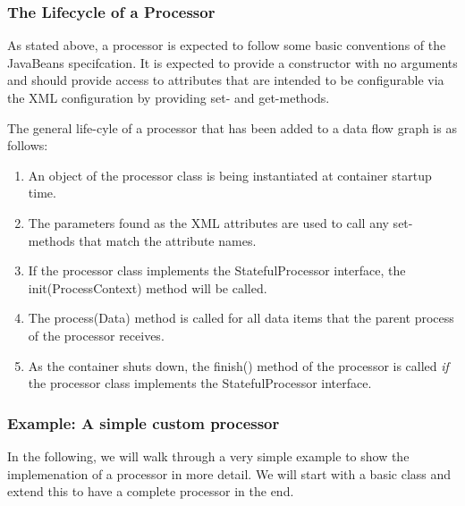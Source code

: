 
\subsubsection{\label{sec:processorLifecycle}The Lifecycle of a Processor}
As stated above, a processor is expected to follow some basic
conventions of the JavaBeans specifcation. It is expected to provide a
constructor with no arguments and should provide access to attributes
that are intended to be configurable via the XML configuration by
providing {\ttfamily set}- and {\ttfamily get}-methods.

The general life-cyle of a processor that has been added to a data flow
graph is as follows:

\begin{enumerate}
  \item An object of the processor class is being instantiated at
    container startup time.
  \item The parameters found as the XML attributes are used to
    call any {\ttfamily set}-methods that match the attribute names.
  \item If the processor class implements the {\ttfamily StatefulProcessor}
    interface, the {\ttfamily init(ProcessContext)} method will be called.
  \item The {\ttfamily process(Data)} method is called for all data items
    that the parent process of the processor receives.
  \item As the container shuts down, the {\ttfamily finish()} method of
    the processor is called {\em if} the processor class implements the
    {\ttfamily StatefulProcessor} interface.
\end{enumerate}




\subsubsection{\label{sec:exampleProcessor}Example: A simple custom processor}
In the following, we will walk through a very simple example to show
the implemenation of a processor in more detail. We will start with a
basic class and extend this to have a complete processor in the end.

